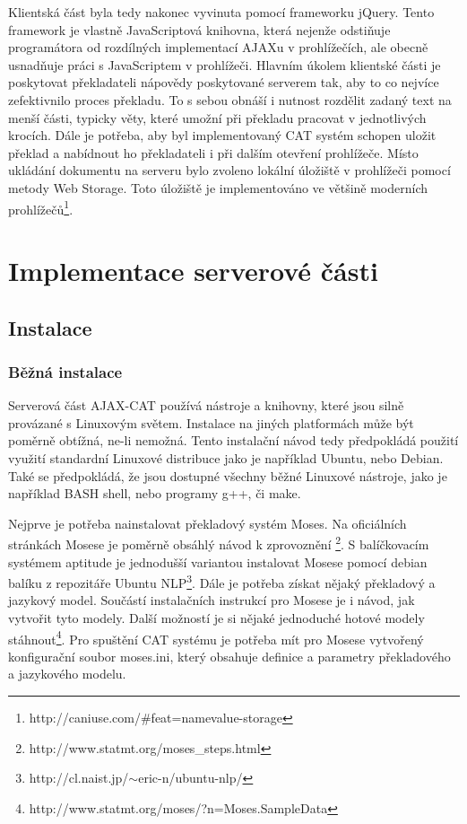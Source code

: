 \documentclass[12pt,a4paper]{report}
\begin{document}
Klientská část byla tedy nakonec vyvinuta pomocí frameworku jQuery. Tento framework je vlastně JavaScriptová knihovna, která nejenže odstiňuje programátora od rozdílných implementací AJAXu v prohlížečích, ale obecně usnadňuje práci s JavaScriptem v prohlížeči. Hlavním úkolem klientské části je poskytovat překladateli nápovědy poskytované serverem tak, aby to co nejvíce zefektivnilo proces překladu. To s sebou obnáší i nutnost rozdělit zadaný text na menší části, typicky věty, které umožní při překladu pracovat v jednotlivých krocích. Dále je potřeba, aby byl implementovaný CAT systém schopen uložit překlad a nabídnout ho překladateli i při dalším otevření prohlížeče. Místo ukládání dokumentu na serveru bylo zvoleno lokální úložiště v prohlížeči pomocí metody Web Storage. Toto úložiště je implementováno ve většině moderních prohlížečů\footnote{http://caniuse.com/\#feat=namevalue-storage}.


\chapter{Implementace serverové části}

\section{Instalace}

\subsection{Běžná instalace}
Serverová část AJAX-CAT používá nástroje a knihovny, které jsou silně provázané s Linuxovým světem. Instalace na jiných platformách může být poměrně obtížná, ne-li nemožná. Tento instalační návod tedy předpokládá použití využití standardní Linuxové distribuce jako je například Ubuntu, nebo Debian. Také se předpokládá, že jsou dostupné všechny běžné Linuxové nástroje, jako je například BASH shell, nebo programy g++, či make.

Nejprve je potřeba nainstalovat překladový systém Moses. Na oficiálních stránkách Mosese je poměrně obsáhlý návod k zprovoznění
\footnote{http://www.statmt.org/moses\_steps.html}. S balíčkovacím systémem aptitude je jednodušší variantou instalovat Mosese pomocí debian balíku z repozitáře Ubuntu NLP\footnote{http://cl.naist.jp/$\sim$eric-n/ubuntu-nlp/}. Dále je potřeba získat nějaký překladový a jazykový model. Součástí instalačních instrukcí pro Mosese je i návod, jak vytvořit tyto modely. Další možností je si nějaké jednoduché hotové modely stáhnout\footnote{http://www.statmt.org/moses/?n=Moses.SampleData}. Pro spuštění CAT systému je potřeba mít pro Mosese vytvořený konfigurační soubor moses.ini, který obsahuje definice a parametry překladového a jazykového modelu.
\end{document}

